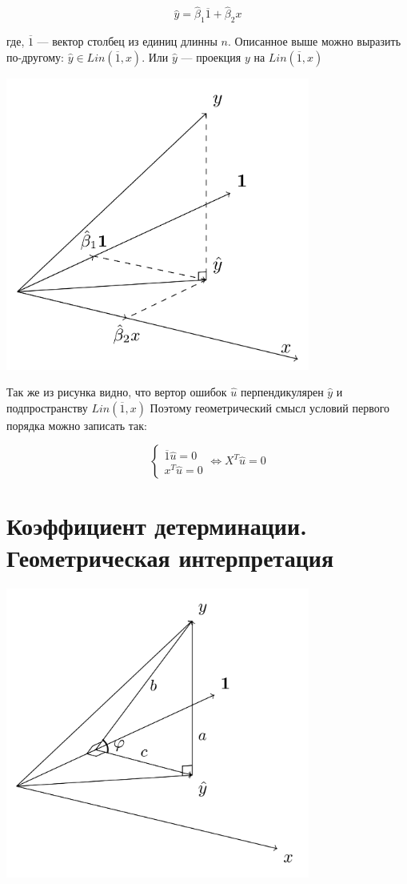 \documentclass[12pt]{article} %
\theoremstyle{definition} %
\def \hb{\hat{\beta}}
\def \hy{\hat{y}}
\def \hu{\hat{u}}
\begin{document}
\[
\hy = \hb_1 \overline{1} + \hb_2 x
\]

где, $\overline{1}$ — вектор столбец из единиц длинны $n$.
Описанное выше можно выразить по-другому: $\hy \in Lin(\overline{1}, x)$. Или $\hy$ — проекция $y$ на $Lin(\overline{1}, x)$

\includegraphics[width=10cm]{02_averages_yhat_decomposed}

Так же из рисунка видно, что вертор ошибок $\hu$ перпендикулярен $\hy$ и подпространству $Lin(\overline{1}, x)$ Поэтому геометрический смысл условий первого порядка можно записать так:

\begin{equation*}
 \begin{cases}
   \overline{1}\hu = 0 \\
   x^T\hu = 0
 \end{cases}
 \Leftrightarrow
 X^T\hu = 0
\end{equation*}

\section{Коэффициент детерминации. Геометрическая интерпретация}

\includegraphics[width=10cm]{02_determination_coefficient}
\end{document}
